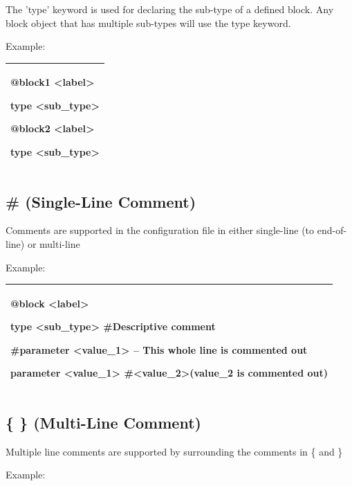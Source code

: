 \documentclass[a4paper,11pt,twoside,pdftex,draft]{article}
\begin{document}
The 'type' keyword is used for declaring the sub-type of a defined
block. Any block object that has multiple sub-types will use the type
keyword.

Example:

\begin{longtable}[]{@{}l@{}}
\toprule
\endhead
\begin{minipage}[t]{0.97\columnwidth}\raggedright
@block1 \textless label\textgreater{}

type \textless sub\_type\textgreater{}

@block2 \textless label\textgreater{}

type \textless sub\_type\textgreater{}\strut
\end{minipage}\tabularnewline
\bottomrule
\end{longtable}

\hypertarget{single-line-comment}{%
\subsection{\# (Single-Line Comment)}\label{single-line-comment}}

Comments are supported in the configuration file in either single-line
(to end-of-line) or multi-line

Example:

\begin{longtable}[]{@{}l@{}}
\toprule
\endhead
\begin{minipage}[t]{0.97\columnwidth}\raggedright
@block \textless label\textgreater{}

type \textless sub\_type\textgreater{} \#Descriptive comment

\#parameter \textless value\_1\textgreater{} -- This whole line is
commented out

parameter \textless value\_1\textgreater{}
\#\textless value\_2\textgreater(value\_2 is commented out)\strut
\end{minipage}\tabularnewline
\bottomrule
\end{longtable}

\hypertarget{multi-line-comment}{%
\subsection{\{ \} (Multi-Line Comment)}\label{multi-line-comment}}

Multiple line comments are supported by surrounding the comments in \{
and \}

Example:
\end{document}
